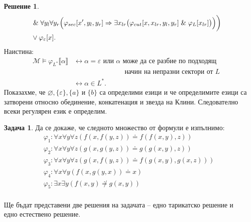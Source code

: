 \documentclass[12pt]{article}
\newcommand{\logand}{\; \& \;}
\newcommand{\calM}{\mathcal{M}}
\newcommand{\db}[1]{\llbracket #1 \rrbracket}
\theoremstyle{definition}
\newtheorem*{solution}{Решение}
\newtheorem{problem}{Задача}
\begin{document}
\begin{solution}
\begin{align*}
                                                                                                           & \logand \forall y_l \forall y_r \Bigl(\varphi_{sec}[x', y_l, y_r] \Rightarrow \exists x_{lr} \big(\varphi_{cut}[x, x_{lr}, y_l, y_r] \logand \varphi_L[x_{lr}]\big)\Bigl)\biggl) \\ 
                                                                                                           & \lor \varphi_\varepsilon[x].
\end{align*}
Наистина:
\begin{align*}
\calM \models \varphi_{L^*}\db{\alpha} & \longleftrightarrow \alpha = \varepsilon \text{ или } \alpha \text{ може да се разбие по подходящ} \\ 
                                       & \phantom{\longleftrightarrow \alpha = \varepsilon \text{ или } \alpha} \; \text{ начин на непразни сектори от } L \\ 
                                       & \longleftrightarrow \alpha \in L^*.
\end{align*}
Показахме, че $\varnothing, \{ \varepsilon \}, \{ a \}$ и $\{ b \}$ са определими езици и че определимите езици са затворени относно обединение, конкатенация и звезда на Клини.
Следователно всеки регулярен език е определим.
\end{solution}

\newpage

\begin{problem}
Да се докаже, че следното множество от формули е изпълнимо:
\begin{align*}
	 & \varphi_1 : \forall x \forall y \forall z (f(x, f(y, z)) \doteq f(f(x, y), z))       \\
	 & \varphi_2 : \forall x \forall y \forall z (g(x, g(y, z)) \doteq g(g(x, y), z))       \\
	 & \varphi_3 : \forall x \forall y \forall z (g(x, f(y, z)) \doteq f(g(x, y), g(x, z))) \\
	 & \varphi_4 : \forall x \forall y (f(x, g(y, x)) \doteq x)                             \\
	 & \varphi_5 : \exists x \exists y (f(x, y) \not \doteq g(x, y))                        \\
\end{align*}
\end{problem}

Ще бъдат представени две решения на задачата -- едно тарикатско решение и едно естествено решение.
\end{document}
